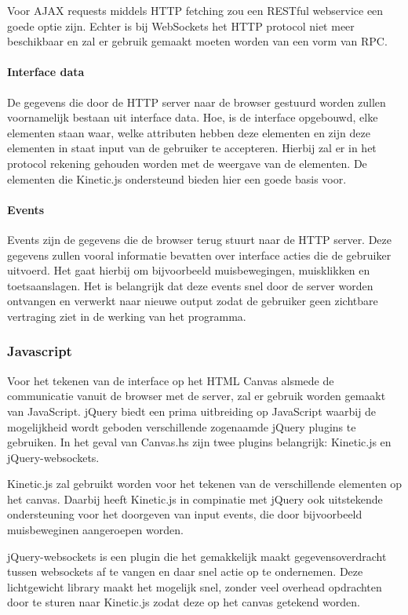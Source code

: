Voor AJAX requests middels HTTP fetching zou een RESTful webservice een goede optie zijn. Echter is bij WebSockets het HTTP protocol niet meer beschikbaar en zal er gebruik gemaakt moeten worden van een vorm van RPC. 
\paragraph{Interface data}
De gegevens die door de HTTP server naar de browser gestuurd worden zullen voornamelijk bestaan uit interface data. Hoe, is de interface opgebouwd, elke elementen staan waar, welke attributen hebben deze elementen en zijn deze elementen in staat input van de gebruiker te accepteren. Hierbij zal er in het protocol rekening gehouden worden met de weergave van de elementen. De elementen die Kinetic.js ondersteund bieden hier een goede basis voor.
\paragraph{Events}
Events zijn de gegevens die de browser terug stuurt naar de HTTP server. Deze gegevens zullen vooral informatie bevatten over interface acties die de gebruiker uitvoerd. Het gaat hierbij om bijvoorbeeld muisbewegingen, muisklikken en toetsaanslagen. Het is belangrijk dat deze events snel door de server worden ontvangen en verwerkt naar nieuwe output zodat de gebruiker geen zichtbare vertraging ziet in de werking van het programma.

\subsubsection{Javascript}
Voor het tekenen van de interface op het HTML Canvas alsmede de communicatie vanuit de browser met de server, zal er gebruik worden gemaakt van JavaScript. jQuery biedt een prima uitbreiding op JavaScript waarbij de mogelijkheid wordt geboden verschillende zogenaamde jQuery plugins te gebruiken. In het geval van Canvas.hs zijn twee plugins belangrijk: Kinetic.js en jQuery-websockets.

Kinetic.js zal gebruikt worden voor het tekenen van de verschillende elementen op het canvas. Daarbij heeft Kinetic.js in compinatie met jQuery ook uitstekende ondersteuning voor het doorgeven van input events, die door bijvoorbeeld muisbeweginen aangeroepen worden. 

jQuery-websockets is een plugin die het gemakkelijk maakt gegevensoverdracht tussen websockets af te vangen en daar snel actie op te ondernemen. Deze lichtgewicht library maakt het mogelijk snel, zonder veel overhead opdrachten door te sturen naar Kinetic.js zodat deze op het canvas getekend worden.

